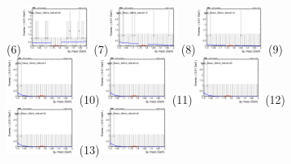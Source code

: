 \begin{figure}[h!]
        \subfigure(6){\includegraphics[width=0.2\textwidth]{power_law/plots/taue/massfit_taue_40bins_bdtcut0.08.png}}
        \subfigure(7){\includegraphics[width=0.2\textwidth]{power_law/plots/taue/massfit_taue_40bins_bdtcut0.12.png}}
        \subfigure(8){\includegraphics[width=0.2\textwidth]{power_law/plots/taue/massfit_taue_40bins_bdtcut0.16.png}}
        \subfigure(9){\includegraphics[width=0.2\textwidth]{power_law/plots/taue/massfit_taue_40bins_bdtcut0.2.png}}
        \subfigure(10){\includegraphics[width=0.2\textwidth]{power_law/plots/taue/massfit_taue_40bins_bdtcut0.24.png}}
        \subfigure(11){\includegraphics[width=0.2\textwidth]{power_law/plots/taue/massfit_taue_40bins_bdtcut0.28.png}}
        \subfigure(12){\includegraphics[width=0.2\textwidth]{power_law/plots/taue/massfit_taue_40bins_bdtcut0.32.png}}
        \subfigure(13){\includegraphics[width=0.2\textwidth]{power_law/plots/taue/massfit_taue_40bins_bdtcut0.36.png}}

\end{figure}

